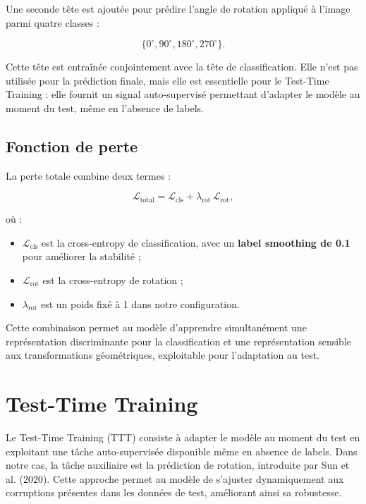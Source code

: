 \documentclass[12pt,a4paper]{report}
\begin{document}
	Une seconde tête est ajoutée pour prédire l’angle de rotation appliqué à l’image parmi quatre classes :
	
	
	\[
	\{0^\circ, 90^\circ, 180^\circ, 270^\circ\}.
	\]
	
	
	
	Cette tête est entraînée conjointement avec la tête de classification.  
	Elle n’est pas utilisée pour la prédiction finale, mais elle est essentielle pour le Test-Time Training :  
	elle fournit un signal auto-supervisé permettant d’adapter le modèle au moment du test, même en l’absence de labels.
	
	\subsection{Fonction de perte}
	
	La perte totale combine deux termes :
	
	
	\[
	\mathcal{L}_{\text{total}} = 
	\mathcal{L}_{\text{cls}} + \lambda_{\text{rot}} \, \mathcal{L}_{\text{rot}},
	\]
	
	
	où :
	\begin{itemize}
		\item $\mathcal{L}_{\text{cls}}$ est la cross-entropy de classification, avec un \textbf{label smoothing de 0.1} pour améliorer la stabilité ;
		\item $\mathcal{L}_{\text{rot}}$ est la cross-entropy de rotation ;
		\item $\lambda_{\text{rot}}$ est un poids fixé à 1 dans notre configuration.
	\end{itemize}
	
	Cette combinaison permet au modèle d’apprendre simultanément une représentation discriminante pour la classification et une représentation sensible aux transformations géométriques, exploitable pour l’adaptation au test.
	
	
	\section{Test-Time Training}
	
	Le Test-Time Training (TTT) consiste à adapter le modèle au moment du test en exploitant une tâche auto-supervisée disponible même en absence de labels. 
	Dans notre cas, la tâche auxiliaire est la prédiction de rotation, introduite par Sun et al. (2020). 
	Cette approche permet au modèle de s’ajuster dynamiquement aux corruptions présentes dans les données de test, améliorant ainsi sa robustesse.
	
\end{document}
